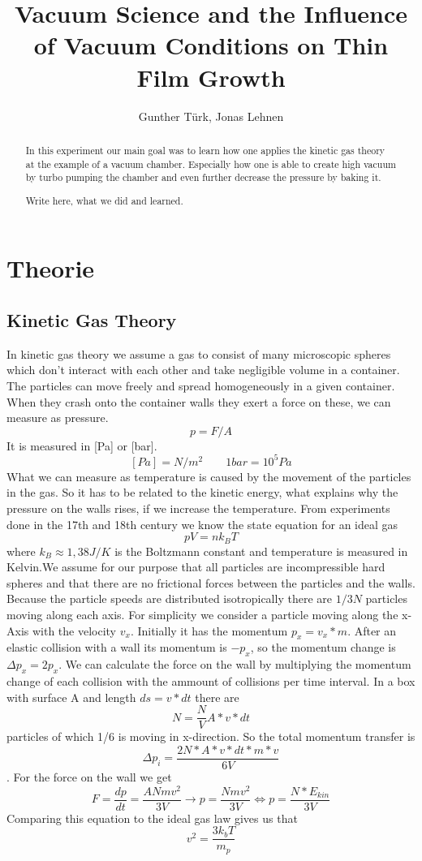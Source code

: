 \documentclass[]{article}
\title{Vacuum Science and the Inﬂuence of Vacuum Conditions on Thin Film Growth}
\author{Gunther T\"urk, Jonas Lehnen}
\begin{document}
\maketitle
\tableofcontents
\begin{abstract}
In this experiment our main goal was to learn how one applies the kinetic gas theory at the example of a vacuum chamber. Especially how one is able to create high vacuum by turbo pumping the chamber and even further decrease the pressure by baking it. 

Write here, what we did and learned.
\end{abstract}

\section{Theorie}
\subsection{Kinetic Gas Theory}
In kinetic gas theory we assume a gas to consist of many microscopic spheres which don't interact with each other and take negligible volume in a container. The particles can move freely and spread homogeneously in a given container. When they crash onto the container walls they exert a force on these, we can measure as pressure. 
\[ p=F/A \]
It is measured in [Pa] or [bar].
\[ [Pa]=N/m^{2}     \qquad  1bar=10^{5}Pa		 \]
What we can measure as temperature is caused by the movement of the particles in the gas. So it has to be related to the kinetic energy, what explains why the pressure on the walls rises, if we increase the temperature. From experiments done in the 17th and 18th century we know the state equation for an ideal gas
\[ pV=nk_{B} T\]
 where $k_{B}\approx1,38J/K$ is the Boltzmann constant and temperature is measured in Kelvin.We assume for our purpose that all particles are incompressible hard spheres and that there are no frictional forces between the particles and the walls. Because the particle speeds are distributed isotropically there are $1/3N$ particles moving along each axis. For simplicity we consider a particle moving along the x-Axis with the velocity $v_{x}$. Initially it has the momentum $p_{x}=v_{x}*m$. After an elastic collision with a wall its momentum is $-p_{x}$, so the momentum change is $\Delta p_{x}=2p_{x}$. We can calculate the force on the wall by multiplying the momentum change of each collision with the ammount of collisions per time interval. In a box with surface A and length $ds=v*dt$ there are \[ N=\frac{N}{V}A *v* dt \] particles of which 1/6 is moving in x-direction. So the total momentum transfer is \[ \Delta p_{i}=\frac{2N* A* v* dt*m* v}{6V} \]. For the force on the wall we get \[ F=\frac{dp}{dt}=\frac{ANmv^{2}}{3V} \rightarrow p=\frac{Nmv^{2}}{3V} \Leftrightarrow p=\frac{N*E_{kin}}{3V}\] Comparing this equation to the ideal gas law gives us that \[ v^{2}=\frac{3k_{b}T}{m_{p}} \] 
\end{document}
